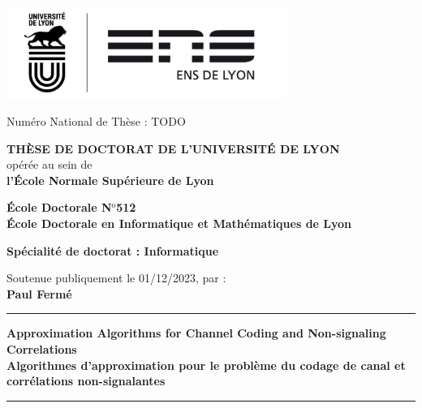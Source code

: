 \documentclass[11pt,a4paper]{book}
\begin{document}
\setlength{\parindent}{0pt}
\thispagestyle{empty}

\begin{center}
\includegraphics[height=3cm]{logo} %
\end{center}


\fontsize{11pt}{13pt}\selectfont
Numéro National de Thèse : TODO

\vspace{1cm}

\begin{center}
\fontsize{14pt}{16pt}\selectfont
\textbf{\uppercase{Thèse de doctorat de l'université de Lyon}}\\
\fontsize{12pt}{14pt}\selectfont
opérée au sein de\\
\textbf{l'École Normale Supérieure de Lyon}

\vspace{0.5cm}

\textbf{École Doctorale N$^{\mathrm{o}}$512\\%
École Doctorale en Informatique et Mathématiques de Lyon}%

\vspace{0.5cm}

\textbf{Spécialité de doctorat : Informatique\\
}


\vspace{1.5cm}

Soutenue publiquement le 01/12/2023, par :\\
\fontsize{14pt}{16pt}\selectfont
\textbf{Paul Fermé}

\vspace{1.5cm} %

\rule[20pt]{\textwidth}{0.5pt}

\fontsize{25pt}{28pt}\selectfont
\textbf{Approximation Algorithms for Channel Coding and Non-signaling Correlations}\\[.5em]
\fontsize{18pt}{21pt}\selectfont
\textbf{Algorithmes d'approximation pour le problème du codage de canal et corrélations non-signalantes}

\rule{\textwidth}{0.5pt}

\vspace{1cm} %
\end{center}
\end{document}

